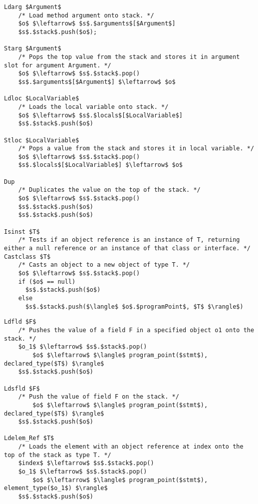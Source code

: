 \begin{lstlisting}[language=CSharp,mathescape,caption=Data-flow rules for local variable handling,label=fig:rulesVariables,float]
Ldarg $Argument$
    /* Load method argument onto stack. */
    $o$ $\leftarrow$ $s$.$arguments$[$Argument$]
    $s$.$stack$.push($o$);
    
Starg $Argument$
    /* Pops the top value from the stack and stores it in argument slot for argument Argument. */
    $o$ $\leftarrow$ $s$.$stack$.pop()
    $s$.$arguments$[$Argument$] $\leftarrow$ $o$

Ldloc $LocalVariable$
    /* Loads the local variable onto stack. */ 
    $o$ $\leftarrow$ $s$.$locals$[$LocalVariable$]
    $s$.$stack$.push($o$)

Stloc $LocalVariable$
    /* Pops a value from the stack and stores it in local variable. */
    $o$ $\leftarrow$ $s$.$stack$.pop()
    $s$.$locals$[$LocalVariable$] $\leftarrow$ $o$

Dup
    /* Duplicates the value on the top of the stack. */
    $o$ $\leftarrow$ $s$.$stack$.pop()
    $s$.$stack$.push($o$)
    $s$.$stack$.push($o$)    

Isinst $T$
    /* Tests if an object reference is an instance of T, returning either a null reference or an instance of that class or interface. */
Castclass $T$
    /* Casts an object to a new object of type T. */
    $o$ $\leftarrow$ $s$.$stack$.pop()
    if ($o$ == null)
      $s$.$stack$.push($o$)
    else
      $s$.$stack$.push($\langle$ $o$.$programPoint$, $T$ $\rangle$)
\end{lstlisting} 

\begin{lstlisting}[language=CSharp,mathescape,caption=Data-flow rules for other variable loading,label=fig:rulesLoad,float]
Ldfld $F$
    /* Pushes the value of a field F in a specified object o1 onto the stack. */
  	$o_1$ $\leftarrow$ $s$.$stack$.pop()
		$o$ $\leftarrow$ $\langle$ program_point($stmt$), declared_type($T$) $\rangle$
    $s$.$stack$.push($o$)

Ldsfld $F$
    /* Push the value of field F on the stack. */
		$o$ $\leftarrow$ $\langle$ program_point($stmt$), declared_type($T$) $\rangle$
    $s$.$stack$.push($o$)

Ldelem_Ref $T$
    /* Loads the element with an object reference at index onto the top of the stack as type T. */
    $index$ $\leftarrow$ $s$.$stack$.pop()
  	$o_1$ $\leftarrow$ $s$.$stack$.pop()
		$o$ $\leftarrow$ $\langle$ program_point($stmt$), element_type($o_1$) $\rangle$
    $s$.$stack$.push($o$)
\end{lstlisting}

